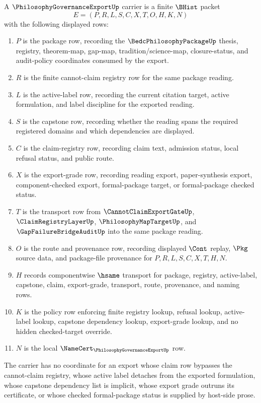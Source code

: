 \begin{definition}
\label{def:philosophy-governance-export-carrier}
A $\PhilosophyGovernanceExportUp$ carrier is a finite $\BHist$ packet
$$
E=(P,R,L,S,C,X,T,O,H,K,N)
$$
with the following displayed rows:
\begin{enumerate}
\item $P$ is the package row, recording the $\BedcPhilosophyPackageUp$ thesis, registry, theorem-map, gap-map, tradition/science-map, closure-status, and audit-policy coordinates consumed by the export.
\item $R$ is the finite cannot-claim registry row for the same package reading.
\item $L$ is the active-label row, recording the current citation target, active formulation, and label discipline for the exported reading.
\item $S$ is the capstone row, recording whether the reading spans the required registered domains and which dependencies are displayed.
\item $C$ is the claim-registry row, recording claim text, admission status, local refusal status, and public route.
\item $X$ is the export-grade row, recording reading export, paper-synthesis export, component-checked export, formal-package target, or formal-package checked status.
\item $T$ is the transport row from $\CannotClaimExportGateUp$, $\ClaimRegistryLayerUp$, $\PhilosophyMapTargetUp$, and $\GapFailureBridgeAuditUp$ into the same package reading.
\item $O$ is the route and provenance row, recording displayed $\Cont$ replay, $\Pkg$ source data, and package-file provenance for $P,R,L,S,C,X,T,H,N$.
\item $H$ records componentwise $\hsame$ transport for package, registry, active-label, capstone, claim, export-grade, transport, route, provenance, and naming rows.
\item $K$ is the policy row enforcing finite registry lookup, refusal lookup, active-label lookup, capstone dependency lookup, export-grade lookup, and no hidden checked-target override.
\item $N$ is the local $\NameCert_{\PhilosophyGovernanceExportUp}$ row.
\end{enumerate}
The carrier has no coordinate for an export whose claim row bypasses the cannot-claim registry, whose active label detaches from the exported formulation, whose capstone dependency list is implicit, whose export grade outruns its certificate, or whose checked formal-package status is supplied by host-side prose.
\end{definition}

